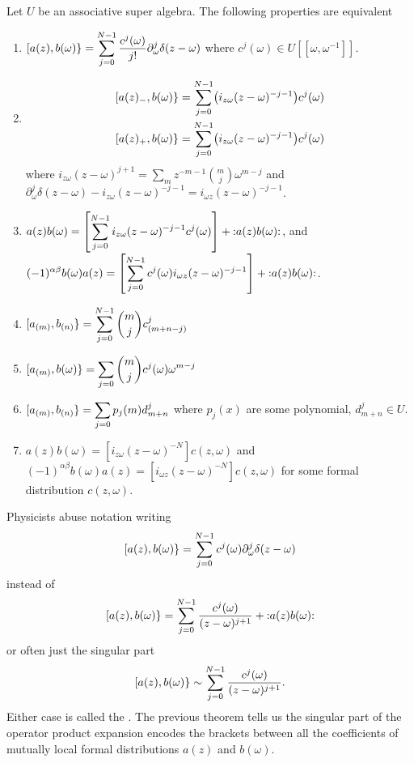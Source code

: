 \label{thm:manyPropertiesForFormalDistributions}%
Let $U$ be an associative super algebra.
The following properties are equivalent
\begin{enumerate}
\item
  $\displaystyle[a(z),b(\omega)\}=\sum^{N-1}_{j=0}\frac{c^{j}(\omega)}{j!}\partial_{\omega}^{j}\delta(z-\omega)$
  where $c^{j}(\omega)\in U[[\omega,\omega^{-1}]]$.
\item
\begin{align*}
\superb{a(z)_{-}}{b(\omega)} &= \sum^{N-1}_{j=0}\bigl(i_{z\omega}(z-\omega)^{-j-1}\bigr)c^{j}(\omega)\\
\superb{a(z)_{+}}{b(\omega)} &= \sum^{N-1}_{j=0}\bigl(i_{z\omega}(z-\omega)^{-j-1}\bigr)c^{j}(\omega)
\end{align*}
where $i_{z\omega}(z-\omega)^{j+1}=\sum_{m}z^{-m-1}\binom{m}{j}\omega^{m-j}$ and
$\partial_{\omega}^{j}\delta(z-\omega)-i_{z\omega}(z-\omega)^{-j-1}=i_{\omega
z}(z-\omega)^{-j-1}$.
\item $\displaystyle
a(z)b(\omega)=\left[\sum^{N-1}_{j=0}i_{z\omega}(z-\omega)^{-j-1}c^{j}(\omega)\right]+\mathop{:}\nolimits\!a(z)b(\omega)\!\mathop{:}\nolimits$,
and
$\displaystyle
(-1)^{\alpha\beta}b(\omega)a(z)=\left[\sum^{N-1}_{j=0}c^{j}(\omega)i_{\omega z}
(z-\omega)^{-j-1}\right]+\mathop{:}\nolimits\!a(z)b(\omega)\!\mathop{:}\nolimits$.
\item\label{thm:manyPropertiesForFormalDistributions:prop:iv} $\displaystyle[a_{(m)},b_{(n)}\}=\sum^{N-1}_{j=0}\binom{m}{j}c^{j}_{(m+n-j)}$
\item $\displaystyle[a_{(m)},b(\omega)\}=\sum_{j=0}\binom{m}{j}c^{j}(\omega)\omega^{m-j}$
\item
$\displaystyle[a_{(m)},b_{(n)}\}=\sum_{j=0}p_{j}(m)d^{j}_{m+n}$
where $p_{j}(x)$ are some polynomial, $d^{j}_{m+n}\in U$.
\item $a(z)b(\omega)=\left[i_{z\omega}(z-\omega)^{-N}\right]c(z,\omega)$
and $(-1)^{\alpha\beta}b(\omega)a(z)=[i_{\omega z}(z-\omega)^{-N}]c(z,\omega)$
for some formal distribution $c(z,\omega)$.
\end{enumerate}

\M
Physicists abuse notation writing
\begin{equation}
[a(z),b(\omega)\}=\sum^{N-1}_{j=0}c^{j}(\omega)\partial_{\omega}^{j}\delta(z-\omega)
\end{equation}
instead of
\begin{equation}
[a(z),b(\omega)\}=\sum^{N-1}_{j=0}\frac{c^{j}(\omega)}{(z-\omega)^{j+1}}
+\mathop{:}\nolimits\!a(z)b(\omega)\!\mathop{:}\nolimits
\end{equation}
or often just the singular part
\begin{equation}
[a(z),b(\omega)\}\sim\sum^{N-1}_{j=0}\frac{c^{j}(\omega)}{(z-\omega)^{j+1}}.
\end{equation}
Either case is called the %
. The
previous theorem tells us the singular part of the operator product
expansion encodes the brackets between all the coefficients of mutually
local formal distributions $a(z)$ and $b(\omega)$.

